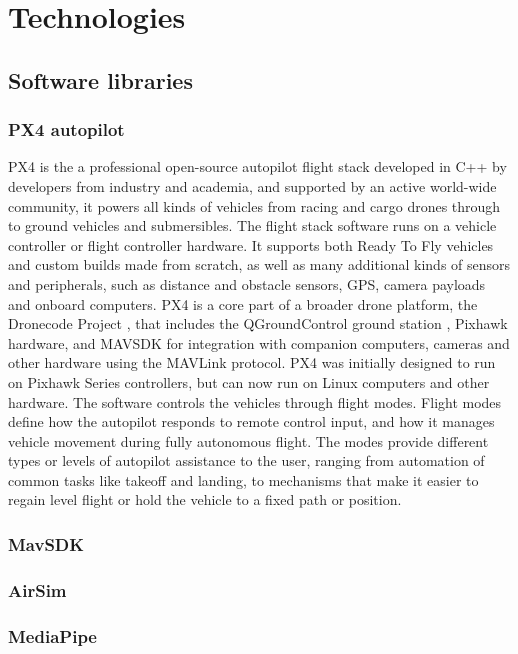 \section{Technologies}

\subsection{Software libraries}
\subsubsection{PX4 autopilot}
PX4  is the a professional open-source autopilot flight stack developed in C++ by developers from industry and academia, and supported by an active world-wide community,
it powers all kinds of vehicles from racing and cargo drones through to ground vehicles and submersibles.
The flight stack software runs on a vehicle controller or flight controller hardware. It supports both Ready To Fly vehicles and custom builds made from scratch,
as well as many additional kinds of sensors and peripherals, such as distance and obstacle sensors, GPS, camera payloads and onboard computers.
PX4 is a core part of a broader drone platform, the Dronecode Project , that includes the QGroundControl ground station , Pixhawk hardware,
and MAVSDK for integration with companion computers, cameras and other hardware using the MAVLink protocol.
PX4 was initially designed to run on Pixhawk Series controllers, but can now run on Linux computers and other hardware.
The software controls the vehicles through flight modes. 
Flight modes define how the autopilot responds to remote control input, and how it manages vehicle movement during fully autonomous flight.
The modes provide different types or levels of autopilot assistance to the user, ranging from automation of common tasks like takeoff and landing, 
to mechanisms that make it easier to regain level flight or hold the vehicle to a fixed path or position.

\subsubsection{MavSDK}


\subsubsection{AirSim}


\subsubsection{MediaPipe}



